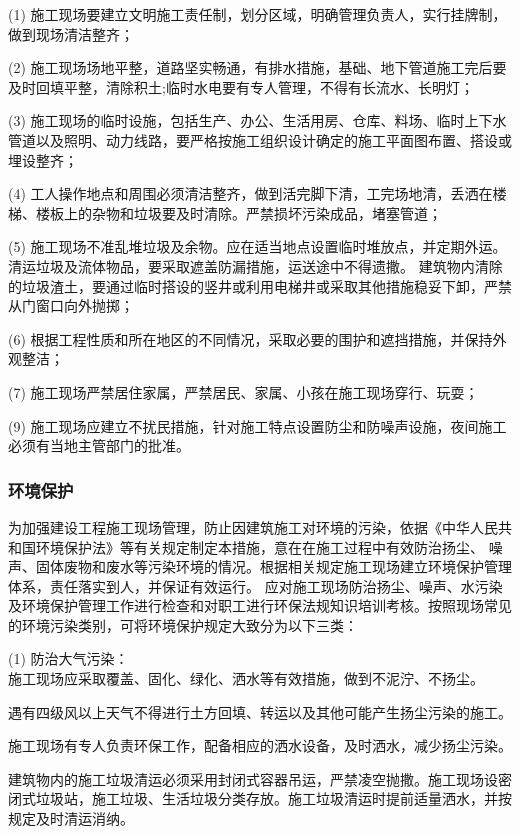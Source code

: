 (1) 施工现场要建立文明施工责任制，划分区域，明确管理负责人，实行挂牌制，做到现场清洁整齐；

(2) 施工现场场地平整，道路坚实畅通，有排水措施，基础、地下管道施工完后要及时回填平整，清除积土;临时水电要有专人管理，不得有长流水、长明灯；

(3) 施工现场的临时设施，包括生产、办公、生活用房、仓库、料场、临时上下水管道以及照明、动力线路，要严格按施工组织设计确定的施工平面图布置、搭设或埋设整齐；

(4) 工人操作地点和周围必须清洁整齐，做到活完脚下清，工完场地清，丢洒在楼梯、楼板上的杂物和垃圾要及时清除。严禁损坏污染成品，堵塞管道；

(5) 施工现场不准乱堆垃圾及余物。应在适当地点设置临时堆放点，并定期外运。清运垃圾及流体物品，要采取遮盖防漏措施，运送途中不得遗撒。
建筑物内清除的垃圾渣土，要通过临时搭设的竖井或利用电梯井或采取其他措施稳妥下卸，严禁从门窗口向外抛掷；

(6) 根据工程性质和所在地区的不同情况，采取必要的围护和遮挡措施，并保持外观整洁；

(7) 施工现场严禁居住家属，严禁居民、家属、小孩在施工现场穿行、玩耍；

(9) 施工现场应建立不扰民措施，针对施工特点设置防尘和防噪声设施，夜间施工必须有当地主管部门的批准。

\subsubsection{环境保护}

为加强建设工程施工现场管理，防止因建筑施工对环境的污染，依据《中华人民共和国环境保护法》等有关规定制定本措施，意在在施工过程中有效防治扬尘、
噪声、固体废物和废水等污染环境的情况。根据相关规定施工现场建立环境保护管理体系，责任落实到人，并保证有效运行。
应对施工现场防治扬尘、噪声、水污染及环境保护管理工作进行检查和对职工进行环保法规知识培训考核。按照现场常见的环境污染类别，可将环境保护规定大致分为以下三类：

(1) 防治大气污染：\\

 施工现场应采取覆盖、固化、绿化、洒水等有效措施，做到不泥泞、不扬尘。

 遇有四级风以上天气不得进行土方回填、转运以及其他可能产生扬尘污染的施工。  

 施工现场有专人负责环保工作，配备相应的洒水设备，及时洒水，减少扬尘污染。  

 建筑物内的施工垃圾清运必须采用封闭式容器吊运，严禁凌空抛撒。施工现场设密闭式垃圾站，施工垃圾、生活垃圾分类存放。施工垃圾清运时提前适量洒水，并按规定及时清运消纳。  


